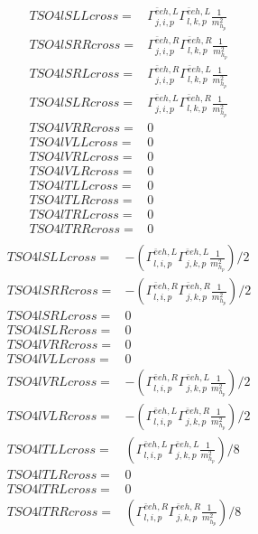 \documentclass[A4,landscape]{article}
\begin{document}
\begin{align} 
  TSO4lSLLcross= & \Gamma^{\bar{e}e h ,L}_{j, i, p} \Gamma^{\bar{e}e h ,L}_{l, k, p} \frac{1}{m^2_{h_{{p}}}} \\ 
  TSO4lSRRcross= & \Gamma^{\bar{e}e h ,R}_{j, i, p} \Gamma^{\bar{e}e h ,R}_{l, k, p} \frac{1}{m^2_{h_{{p}}}} \\ 
  TSO4lSRLcross= & \Gamma^{\bar{e}e h ,R}_{j, i, p} \Gamma^{\bar{e}e h ,L}_{l, k, p} \frac{1}{m^2_{h_{{p}}}} \\ 
  TSO4lSLRcross= & \Gamma^{\bar{e}e h ,L}_{j, i, p} \Gamma^{\bar{e}e h ,R}_{l, k, p} \frac{1}{m^2_{h_{{p}}}} \\ 
  TSO4lVRRcross= & 0 \\ 
  TSO4lVLLcross= & 0 \\ 
  TSO4lVRLcross= & 0 \\ 
  TSO4lVLRcross= & 0 \\ 
  TSO4lTLLcross= & 0 \\ 
  TSO4lTLRcross= & 0 \\ 
  TSO4lTRLcross= & 0 \\ 
  TSO4lTRRcross= & 0 \\ 
\end{align} 
\begin{align} 
  TSO4lSLLcross= & -(\Gamma^{\bar{e}e h ,L}_{l, i, p} \Gamma^{\bar{e}e h ,L}_{j, k, p} \frac{1}{m^2_{h_{{p}}}})/2 \\ 
  TSO4lSRRcross= & -(\Gamma^{\bar{e}e h ,R}_{l, i, p} \Gamma^{\bar{e}e h ,R}_{j, k, p} \frac{1}{m^2_{h_{{p}}}})/2 \\ 
  TSO4lSRLcross= & 0 \\ 
  TSO4lSLRcross= & 0 \\ 
  TSO4lVRRcross= & 0 \\ 
  TSO4lVLLcross= & 0 \\ 
  TSO4lVRLcross= & -(\Gamma^{\bar{e}e h ,R}_{l, i, p} \Gamma^{\bar{e}e h ,L}_{j, k, p} \frac{1}{m^2_{h_{{p}}}})/2 \\ 
  TSO4lVLRcross= & -(\Gamma^{\bar{e}e h ,L}_{l, i, p} \Gamma^{\bar{e}e h ,R}_{j, k, p} \frac{1}{m^2_{h_{{p}}}})/2 \\ 
  TSO4lTLLcross= & (\Gamma^{\bar{e}e h ,L}_{l, i, p} \Gamma^{\bar{e}e h ,L}_{j, k, p} \frac{1}{m^2_{h_{{p}}}})/8 \\ 
  TSO4lTLRcross= & 0 \\ 
  TSO4lTRLcross= & 0 \\ 
  TSO4lTRRcross= & (\Gamma^{\bar{e}e h ,R}_{l, i, p} \Gamma^{\bar{e}e h ,R}_{j, k, p} \frac{1}{m^2_{h_{{p}}}})/8 \\ 
\end{align} 
\end{document}
